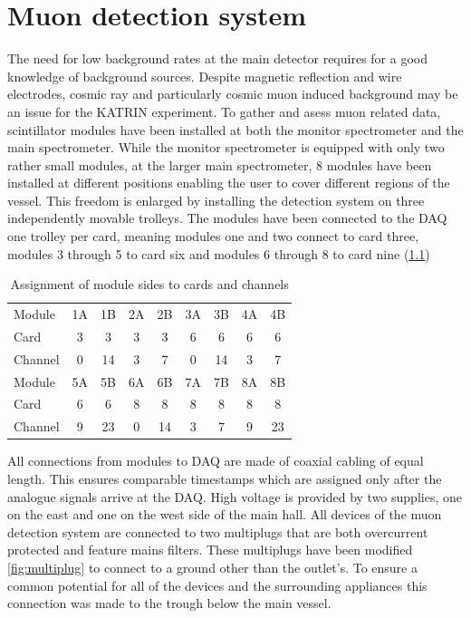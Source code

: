 
\chapter{Muon detection system}
\label{ch:The muon detection system}
  The need for low background rates at the main detector requires for a good knowledge of background sources. Despite magnetic reflection and wire electrodes, cosmic ray and particularly cosmic muon induced background may be an issue for the KATRIN experiment. To gather and asess muon related data, scintillator modules have been installed at both the monitor spectrometer and the main spectrometer. While the monitor spectrometer is equipped with only two rather small modules, at the larger main spectrometer, 8 modules have been installed at different positions enabling the user to cover different regions of the vessel. This freedom is enlarged by installing the detection system on three independently movable trolleys.
  The modules have been connected to the DAQ one trolley per card, meaning modules one and two connect to card three, modules 3 through 5 to card six and modules 6 through 8 to card nine (\ref{tab:connectionsModulesCards})
  \begin{table}
  	\centering
  	\begin{tabular}{| l | c c | c c | c c | c c |}
  	\hline
  		Module	& 1A	& 1B	& 2A	& 2B	& 3A	& 3B	& 4A	& 4B 	\\
  		Card	& 3	& 3	& 3	& 3	& 6	& 6	& 6	& 6	\\
  		Channel	& 0	& 14	& 3	& 7	& 0	& 14	& 3	& 7	\\
  		\hline \hline
  		Module	&5A	& 5B	& 6A	& 6B	& 7A	& 7B	& 8A	& 8B	\\
  		Card	& 6	& 6	& 8	& 8	& 8	& 8	& 8	& 8	\\
  		Channel	& 9	& 23	& 0	& 14	& 3	& 7	& 9	& 23	\\
  		\hline
  	\end{tabular}
  	\caption[Channel assignment]{Assignment of module sides to cards and channels}
  	\label{tab:connectionsModulesCards}
  \end{table}
  All connections from modules to DAQ are made of coaxial cabling of equal length. This ensures comparable timestamps which are assigned only after the analogue signals arrive at the DAQ. High voltage is provided by two supplies, one on the east and one on the west side of the main hall.
  All devices of the muon detection system are connected to two multiplugs that are both overcurrent protected and feature mains filters. These multiplugs have been modified \ref{fig:multiplug} to connect to a ground other than the outlet's. To ensure a common potential for all of the devices and the surrounding appliances this connection was made to the trough below the main vessel.
  
